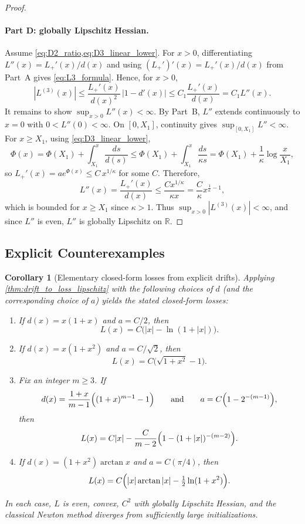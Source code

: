 \documentclass{article}
\theoremstyle{plain}
\newtheorem{corollary}[theorem]{Corollary}
\theoremstyle{definition}
\theoremstyle{remark}
\begin{document}
\begin{proof}
\paragraph{Part D: globally Lipschitz Hessian.}
Assume \cref{eq:D2_ratio,eq:D3_linear_lower}.
For $x>0$, differentiating $L''(x)=L_+'(x)/d(x)$ and using $(L_+')'(x)=L_+'(x)/d(x)$
from Part~A gives \cref{eq:L3_formula}. Hence, for $x>0$,
\[
|L^{(3)}(x)| \le \frac{L_+'(x)}{d(x)^2}\,|1-d'(x)|
\le C_1 \frac{L_+'(x)}{d(x)} = C_1 L''(x).
\]
It remains to show $\sup_{x>0}L''(x)<\infty$.
By Part~B, $L''$ extends continuously to $x=0$ with $0<L''(0)<\infty$.
On $[0,X_1]$, continuity gives $\sup_{[0,X_1]}L''<\infty$.
For $x\ge X_1$, using \cref{eq:D3_linear_lower},
\[
\Phi(x)=\Phi(X_1)+\int_{X_1}^x \frac{ds}{d(s)}
\le \Phi(X_1)+\int_{X_1}^x \frac{ds}{\kappa s}
=\Phi(X_1)+\frac{1}{\kappa}\log\frac{x}{X_1},
\]
so $L_+'(x)=a e^{\Phi(x)}\le C\,x^{1/\kappa}$ for some $C$.
Therefore,
\[
L''(x)=\frac{L_+'(x)}{d(x)}\le \frac{C x^{1/\kappa}}{\kappa x}
= \frac{C}{\kappa}x^{\frac{1}{\kappa}-1},
\]
which is bounded for $x\ge X_1$ since $\kappa>1$.
Thus $\sup_{x>0}|L^{(3)}(x)|<\infty$, and since $L''$ is even, $L''$ is globally Lipschitz on $\mathbb{R}$.
\end{proof}

\subsection{Explicit Counterexamples }

\begin{corollary}[Elementary closed-form losses from explicit drifts]
\label{cor:elementary_losses_from_drifts}
Applying \cref{thm:drift_to_loss_lipschitz} with the following choices of $d$
(and the corresponding choice of $a$) yields the stated closed-form losses:
\begin{enumerate}
\item If $d(x)=x(1+x)$ and $a=C/2$, then
\[
L(x)=C\bigl(|x|-\ln(1+|x|)\bigr).
\]

\item If $d(x)=x(1+x^2)$ and $a=C/\sqrt{2}$, then
\[
L(x)=C\bigl(\sqrt{1+x^2}-1\bigr).
\]

\item Fix an integer $m\ge 3$. If
\[
d(x)=\frac{1+x}{m-1}\Bigl((1+x)^{m-1}-1\Bigr)
\qquad\text{and}\qquad
a=C\Bigl(1-2^{-(m-1)}\Bigr),
\]
then
\[
L(x)=C|x|-\frac{C}{m-2}\Bigl(1-(1+|x|)^{-(m-2)}\Bigr).
\]

\item If $d(x)=(1+x^2)\arctan x$ and $a=C(\pi/4)$, then
\[
L(x)=C\Bigl(|x|\arctan|x|-\tfrac12\ln(1+x^2)\Bigr).
\]
\end{enumerate}
In each case, $L$ is even, convex, $C^2$ with globally Lipschitz Hessian, and the
classical Newton method diverges from sufficiently large initializations.
\end{corollary}
\end{document}
